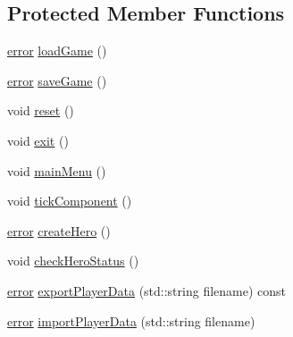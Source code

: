 \subsection*{Protected Member Functions}
\begin{DoxyCompactItemize}
\item 
\mbox{\hyperlink{_errors_list_8h_af10dacfa214e2575bb2e0ee407c242e0}{error}} \mbox{\hyperlink{class_c_game_accda079824fc813cbd64b4743846ae24}{load\+Game}} ()
\item 
\mbox{\hyperlink{_errors_list_8h_af10dacfa214e2575bb2e0ee407c242e0}{error}} \mbox{\hyperlink{class_c_game_a49656fe4404b3df63f2dbebd9b754edd}{save\+Game}} ()
\item 
void \mbox{\hyperlink{class_c_game_acdb5a10d8b17584b07b3c736ede7bf57}{reset}} ()
\item 
void \mbox{\hyperlink{class_c_game_a7b4409fd50b77ae5743a30bd43f01f61}{exit}} ()
\item 
void \mbox{\hyperlink{class_c_game_a39e1e296c6dcabbf5c824eea6424d6d9}{main\+Menu}} ()
\item 
void \mbox{\hyperlink{class_c_game_a714b291af5e20aae8be14a905fd0522d}{tick\+Component}} ()
\item 
\mbox{\hyperlink{_errors_list_8h_af10dacfa214e2575bb2e0ee407c242e0}{error}} \mbox{\hyperlink{class_c_game_a21a30939333b2c98f607d9bd2927d105}{create\+Hero}} ()
\item 
void \mbox{\hyperlink{class_c_game_ac0a8028013ca5a7c135c29fa582df4a0}{check\+Hero\+Status}} ()
\item 
\mbox{\hyperlink{_errors_list_8h_af10dacfa214e2575bb2e0ee407c242e0}{error}} \mbox{\hyperlink{class_c_game_a7d821ce9a0454653bbfde69979155da9}{export\+Player\+Data}} (std\+::string filename) const
\item 
\mbox{\hyperlink{_errors_list_8h_af10dacfa214e2575bb2e0ee407c242e0}{error}} \mbox{\hyperlink{class_c_game_a507b71eeebc2a6aaa08d9e0dcb61c7ac}{import\+Player\+Data}} (std\+::string filename)
\end{DoxyCompactItemize}
